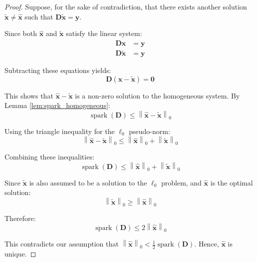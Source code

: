 \documentclass[12pt]{article}
\renewcommand{\vec}[1]{\mathbf{#1}}
\DeclareMathOperator{\spark}{spark}
\newcommand{\zeronorm}[1]{\left\|#1\right\|_0}
\theoremstyle{definition}
\begin{document}
\begin{proof}
    Suppose, for the sake of contradiction, that there exists another solution $\tilde{\vec{x}} \neq \hat{\vec{x}}$ such that $\mathbf{D}\tilde{\vec{x}} = \vec{y}$.

    Since both $\hat{\vec{x}}$ and $\tilde{\vec{x}}$ satisfy the linear system:
    \begin{align}
        \mathbf{D}\hat{\vec{x}}   & = \vec{y} \\
        \mathbf{D}\tilde{\vec{x}} & = \vec{y}
    \end{align}

    Subtracting these equations yields:
    \begin{equation}
        \mathbf{D}(\hat{\vec{x}} - \tilde{\vec{x}}) = \vec{0}
    \end{equation}

    This shows that $\hat{\vec{x}} - \tilde{\vec{x}}$ is a non-zero solution to the homogeneous system. By Lemma \ref{lem:spark_homogeneous}:
    \begin{equation}
        \spark(\mathbf{D}) \leq \zeronorm{\hat{\vec{x}} - \tilde{\vec{x}}}
    \end{equation}

    Using the triangle inequality for the $\ell_0$ pseudo-norm:
    \begin{equation}
        \zeronorm{\hat{\vec{x}} - \tilde{\vec{x}}} \leq \zeronorm{\hat{\vec{x}}} + \zeronorm{\tilde{\vec{x}}}
    \end{equation}

    Combining these inequalities:
    \begin{equation}
        \spark(\mathbf{D}) \leq \zeronorm{\hat{\vec{x}}} + \zeronorm{\tilde{\vec{x}}}
    \end{equation}

    Since $\tilde{\vec{x}}$ is also assumed to be a solution to the $\ell_0$ problem, and $\hat{\vec{x}}$ is the optimal solution:
    \begin{equation}
        \zeronorm{\tilde{\vec{x}}} \geq \zeronorm{\hat{\vec{x}}}
    \end{equation}

    Therefore:
    \begin{equation}
        \spark(\mathbf{D}) \leq 2\zeronorm{\hat{\vec{x}}}
    \end{equation}

    This contradicts our assumption that $\zeronorm{\hat{\vec{x}}} < \frac{1}{2}\spark(\mathbf{D})$. Hence, $\hat{\vec{x}}$ is unique.
\end{proof}
\end{document}
